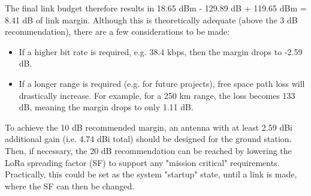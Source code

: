 The final link budget therefore results in 18.65 dBm - 129.89 dB + 119.65 dBm = 8.41 dB of link margin. Although this is theoretically adequate (above the 3 dB recommendation), there are a few considerations to be made:
\begin{itemize}
    \item If a higher bit rate is required, e.g. 38.4 kbps, then the margin drops to -2.59 dB.
    \item If a longer range is required (e.g. for future projects), free space path loss will drastically increase. For example, for a 250 km range, the loss becomes 133 dB, meaning the margin drops to only 1.11 dB.
\end{itemize}

To achieve the 10 dB recommended margin, an antenna with at least 2.59 dBi additional gain (i.e. 4.74 dBi total) should be designed for the ground station. Then, if necessary, the 20 dB recommendation can be reached by lowering the LoRa spreading factor (SF) to support any "mission critical" requirements. Practically, this could be set as the system "startup" state, until a link is made, where the SF can then be changed.